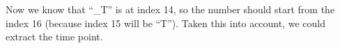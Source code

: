 Now we know that ``\_T'' is at index 14, so the number should start from the index 16 (because index 15 will be ``T''). Taken this into account, we could extract the time point.
